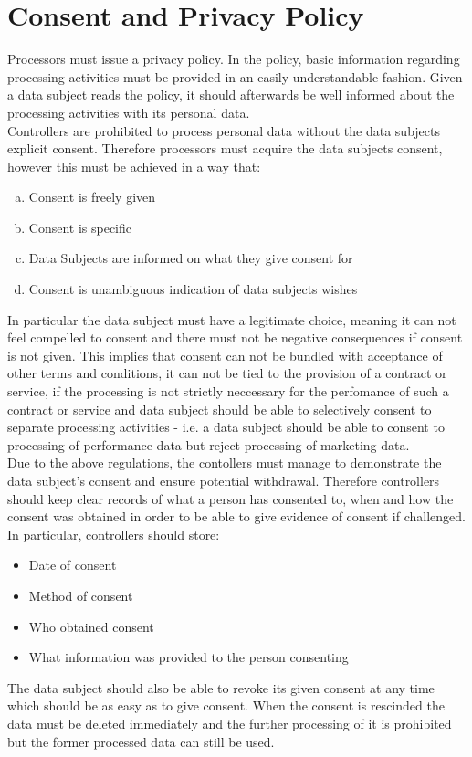 \documentclass[a4paper,12pt]{report}
\begin{document}
	\section{Consent and Privacy Policy}
	\startsection
	Processors must issue a privacy policy.
	In the policy, basic information regarding processing activities must be provided in an easily understandable fashion.
	Given a data subject reads the policy, it should afterwards be well informed about the processing activities with its personal data.\\
	Controllers are prohibited to process personal data without the data subjects explicit consent.
	Therefore processors must acquire the data subjects consent, however this must be achieved in a way that:
	\begin{enumerate}[a)]
		\item Consent is freely given
		\item Consent is specific
		\item Data Subjects are informed on what they give consent for
		\item Consent is unambiguous indication of data subjects wishes
	\end{enumerate}
	In particular the data subject must have a legitimate choice, meaning it can not feel compelled to consent and there must not be negative consequences if consent is not given.
	This implies that consent can not be bundled with acceptance of other terms and conditions, 
	it can not be tied to the provision of a contract or service, if the processing is not strictly neccessary for the perfomance of such a contract or service and
	data subject should be able to selectively consent to separate processing activities - i.e. a data subject should be able to consent to processing of performance data but reject processing of marketing data.\\
	Due to the above regulations, the contollers must manage to demonstrate the data subject's consent and ensure potential withdrawal.
	Therefore controllers should keep clear records of what a person has consented to, when and how the consent was obtained in order to be able to give evidence of consent if challenged. 
	In particular, controllers should store:
	\begin{itemize}
		\item Date of consent
		\item Method of consent
		\item Who obtained consent
		\item What information was provided to the person consenting
	\end{itemize}
	The data subject should also be able to revoke its given consent at any time which should be as easy as to give consent. When the consent is rescinded the data must be deleted immediately and the further processing of it is prohibited but the former processed data can still be used.
	\closesection
\end{document}
